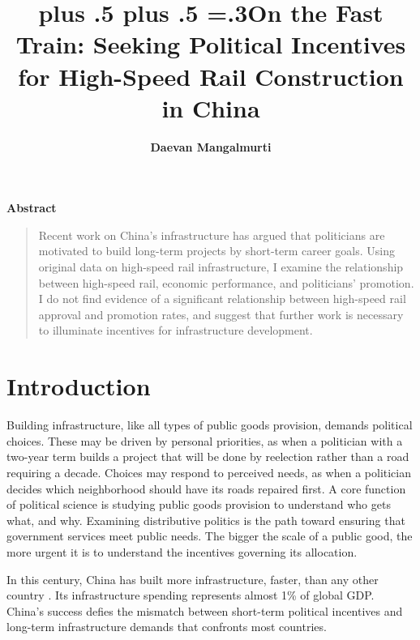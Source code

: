 \documentclass[12pt, ]{article}
\title{\sffamily\bfseries\huge\parfillskip=0pt
\rightskip=0pt plus .5\textwidth
\leftskip=0pt plus .5\textwidth
\emergencystretch=.3\textwidth On the Fast Train: Seeking Political
Incentives for High-Speed Rail Construction in China}
\author{\textbf{Daevan Mangalmurti}
 }
\date{}
\renewenvironment{abstract}{
  \centerline
  {\large\sffamily\bfseries Abstract}\vspace{-1em}
  \begin{quote}\small
}{
  \end{quote}
}
\begin{document}
\allsectionsfont{\sffamily}

\maketitle

\begin{abstract}
Recent work on China's infrastructure has argued that politicians are
motivated to build long-term projects by short-term career goals. Using
original data on high-speed rail infrastructure, I examine the
relationship between high-speed rail, economic performance, and
politicians' promotion. I do not find evidence of a significant
relationship between high-speed rail approval and promotion rates, and
suggest that further work is necessary to illuminate incentives for
infrastructure development.
\end{abstract}

\ifdefined\Shaded\renewenvironment{Shaded}{\begin{tcolorbox}[boxrule=0pt, sharp corners, borderline west={3pt}{0pt}{shadecolor}, breakable, frame hidden, interior hidden, enhanced]}{\end{tcolorbox}}\fi




\hypertarget{introduction}{%
\section{Introduction}\label{introduction}}

Building infrastructure, like all types of public goods provision,
demands political choices. These may be driven by personal priorities,
as when a politician with a two-year term builds a project that will be
done by reelection rather than a road requiring a decade. Choices may
respond to perceived needs, as when a politician decides which
neighborhood should have its roads repaired first. A core function of
political science is studying public goods provision to understand who
gets what, and why. Examining distributive politics is the path toward
ensuring that government services meet public needs. The bigger the
scale of a public good, the more urgent it is to understand the
incentives governing its allocation.

In this century, China has built more infrastructure, faster, than any
other country \citep{OECD2023}. Its infrastructure spending represents
almost 1\% of global GDP. China's success defies the mismatch between
short-term political incentives and long-term infrastructure demands
that confronts most countries.
\end{document}
